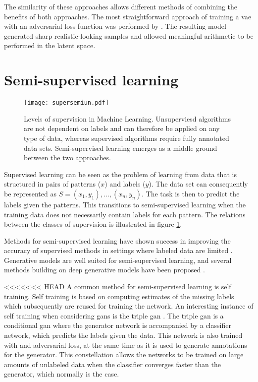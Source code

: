 The similarity of these approaches allows different methods of combining the benefits of both approaches. The most straightforward approach of training a \acrshort{vae} with an adversarial loss function was performed by \textcite{LarsenSW15autoencodingbeyond}. The resulting model generated sharp realistic-looking samples and allowed meaningful arithmetic to be performed in the latent space.

\section{Semi-supervised learning}
\begin{figure}
    \centering
    \texttt{[image: supersemiun.pdf]}
    \caption{Levels of supervision in Machine Learning. Unsuperviesd algorithms are not dependent on labels and can therefore be applied on any type of data, whereas supervised algorithms require fully annotated data sets. Semi-supervised learning emerges as a middle ground between the two approaches.}
    \label{fig:supersemiun}
\end{figure}
Supervised learning can be seen as the problem of learning from data that is structured in pairs of patterns ($x$) and labels ($y$). The data set can consequently be represented as $S = {(x_1, y_1), ..., (x_n, y_n)}$. The task is then to predict the labels given the patterns. This transitions to semi-supervised learning when the training data does not necessarily contain labels for each pattern. The relations between the classes of supervision is illustrated in figure \ref{fig:supersemiun}. 

Methods for semi-supervised learning have shown success in improving the accuracy of supervised methods in settings where labeled data are limited \parencite{Zhou2012}. Generative models are well suited for semi-supervised learning, and several methods building on deep generative models have been proposed \parencite{kingma2014semi, salimans2016improved, springenberg2015unsupervised, wuliu2017selftrainsemisup, li2017triple}.

<<<<<<< HEAD
A common method for semi-supervised learning is self training. Self training is based on computing estimates of the missing labels which subsequently are reused for training the network. An interesting instance of self training when considering \acrshort{gans} is the triple \acrshort{gan} \parencite{li2017triple}. The triple \acrshort{gan} is a conditional \acrshort{gan} where the generator network is accompanied by a classifier network, which predicts the labels given the data. This network is also trained with and adversarial loss, at the same time as it is used to generate annotations for the generator. This constellation allows the networks to be trained on large amounts of unlabeled data when the classifier converges faster than the generator, which normally is the case.

